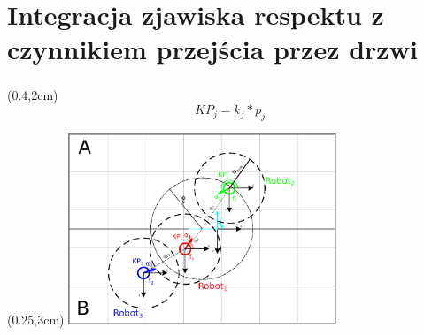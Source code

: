 \documentclass{beamer}
\begin{document}
\section{Integracja zjawiska respektu z czynnikiem przejścia przez drzwi}
\begin{frame}
\frametitle{\secname}

\begin{textblock*}{5cm}(0.4\linewidth,2cm) %
	\begin{equation*}
	KP_j = k_j * p_j
	\end{equation*}
\end{textblock*}

\begin{textblock*}{6cm}(0.25\linewidth,3cm) %
	\includegraphics[page=1,width=8cm]{img/AlgorytmPrzejsciaPrzezDrzwi.pdf}
\end{textblock*}


\end{frame}
\end{document}
